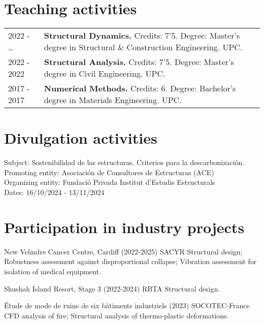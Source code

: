 \documentclass[12pt]{article}
\begin{document}
\section{Teaching activities}
\begin{tabularx}{\linewidth}{lX}
    2022 - \enspace \dots &
    \textbf{Structural Dynamics.} Credits: 7'5. Degree: Master's degree in Structural \& Construction Engineering. UPC. \\

    2022 - 2022 &
    \textbf{Structural Analysis.} Credits: 7'5. Degree: Master's degree in Civil Engineering. UPC. \\

    2017 - 2017 &
    \textbf{Numerical Methods.} Credits: 6. Degree: Bachelor's degree in Materials Engineering. UPC. \\
\end{tabularx}


\printbibliography[heading={bibintoc}, title={Participation in R+D+i projects}, type=project]


\section{Divulgation activities}
\parbox{\linewidth}{
    Subject: Sostenibilidad de las estructuras. Criterios para la descarbonización. \\
    Promoting entity: Asociación de Consultores de Estructuras (ACE) \\
    Organizing entity: Fundació Privada Institut d'Estudis Estructurals \\
    Dates: 16/10/2024 - 13/11/2024
}


\section{Participation in industry projects}
\parbox{\linewidth}{
    New Velindre Cancer Centre, Cardiff (2022-2025) SACYR \newline
    Structural design;
    Robustness assessment against disproportional collapse;
    Vibration assessment for isolation of medical equipment.}

\parbox{\linewidth}{
    Shushah Island Resort, Stage 3 (2022-2024) RBTA \newline
    Structural design.}

\parbox{\linewidth}{
    Étude de mode de ruine de six bâtiments industriels (2023) SOCOTEC-France \newline
    CFD analysis of fire;
    Structural analysis of thermo-plastic deformations.}
\end{document}
